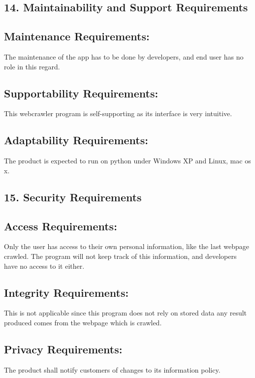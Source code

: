 \documentclass[12pt]{article}
\begin{document}
\subsection{14. Maintainability and Support Requirements }

\subsection{Maintenance Requirements:}
 The maintenance of the app has to be done by developers, and end user has no role in this regard.

\subsection{Supportability Requirements:}

This webcrawler program is self-supporting as its interface is very intuitive.

\subsection{Adaptability Requirements:}

The product is expected to run on python under Windows XP and Linux, mac os x. 

\subsection{15. Security Requirements }

\subsection{Access Requirements:}
Only the user has access to their own personal information, like the last webpage crawled. The program will not keep track of this information, and developers have no access to it either.

\subsection{Integrity Requirements:}
This is not applicable since this program does not rely on stored data any result produced comes from the webpage which is crawled. 

\subsection{Privacy Requirements:}
The product shall notify customers of changes to its information policy.
\end{document}
